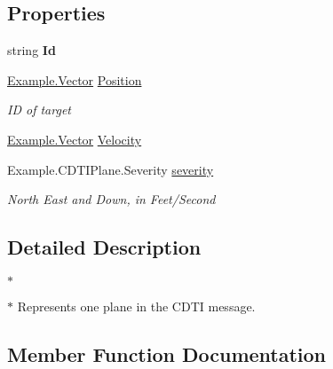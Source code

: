 \subsection*{Properties}
\begin{DoxyCompactItemize}
\item 
string {\bfseries Id}\hypertarget{class_example_1_1_c_d_t_i_plane_a95d3fc498b17a8d92557081390424550}{}\label{class_example_1_1_c_d_t_i_plane_a95d3fc498b17a8d92557081390424550}

\item 
\hyperlink{class_example_1_1_vector}{Example.\+Vector} \hyperlink{class_example_1_1_c_d_t_i_plane_a4d6766b3ddf6726e0b6beda5f7044f39}{Position}
\begin{DoxyCompactList}\small\item\em ID of target\end{DoxyCompactList}\item 
\hyperlink{class_example_1_1_vector}{Example.\+Vector} \hyperlink{class_example_1_1_c_d_t_i_plane_a52e1d4c9df3e1b3b5f281bbac9e49269}{Velocity}
\item 
Example.\+C\+D\+T\+I\+Plane.\+Severity \hyperlink{class_example_1_1_c_d_t_i_plane_ac51cdc50b63036c15eb1dc03f9d8369c}{severity}
\begin{DoxyCompactList}\small\item\em North East and Down, in Feet/\+Second\end{DoxyCompactList}\end{DoxyCompactItemize}


\subsection{Detailed Description}


$\ast$

$\ast$ Represents one plane in the C\+D\+TI message.

\subsection{Member Function Documentation}

